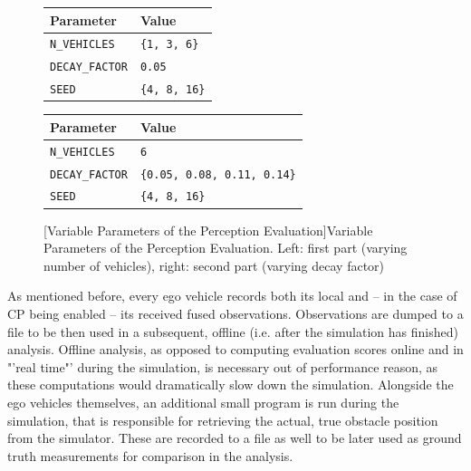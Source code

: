 \begin{figure}
	\begin{minipage}{0.4\textwidth}
		\begin{tabular}{|p{3cm}|p{2.5cm}|}
			\hline 
			\textbf{Parameter} & \textbf{Value} \\ 
			\hline 
			\texttt{N\_VEHICLES} & \texttt{\{1, 3, 6\}} \\ 
			\hline 
			\texttt{DECAY\_FACTOR} & \texttt{0.05} \\ 
			\hline 
			\texttt{SEED} & \texttt{\{4, 8, 16\}} \\ 
			\hline
		\end{tabular}
	\end{minipage}
	\begin{minipage}{0.6\textwidth}
		\begin{tabular}{|p{3cm}|p{5.5cm}|}
			\hline 
			\textbf{Parameter} & \textbf{Value} \\ 
			\hline 
			\texttt{N\_VEHICLES} & \texttt{6} \\ 
			\hline 
			\texttt{DECAY\_FACTOR} & \texttt{\{0.05, 0.08, 0.11, 0.14\}} \\ 
			\hline 
			\texttt{SEED} & \texttt{\{4, 8, 16\}} \\ 
			\hline
		\end{tabular} 
	\end{minipage}
	[Variable Parameters of the Perception Evaluation]{Variable Parameters of the Perception Evaluation. Left: first part (varying number of vehicles), right: second part (varying decay factor)}
	\label{tab:perception_evaluation:variable_parameters}
\end{figure}
\par
\bigskip

As mentioned before, every ego vehicle records both its local and – in the case of CP being enabled – its received fused observations. Observations are dumped to a file to be then used in a subsequent, offline (i.e. after the simulation has finished) analysis. Offline analysis, as opposed to computing evaluation scores online and in "'real time"' during the simulation, is necessary out of performance reason, as these computations would dramatically slow down the simulation. Alongside the ego vehicles themselves, an additional small program is run during the simulation, that is responsible for retrieving the actual, true obstacle position from the simulator. These are recorded to a file as well to be later used as ground truth measurements for comparison in the analysis. 
\par
\bigskip

